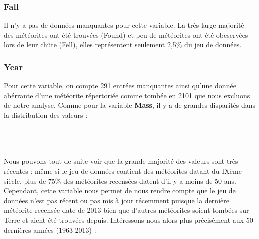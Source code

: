 \documentclass[12pt]{article}
\begin{document}
\subsubsection*{Fall}
Il n'y a pas de données manquantes pour cette variable. La très large majorité des météorites ont été trouvées (Found) et peu de météorites ont été obeservées lors de leur chûte (Fell), elles représentent seulement 2,5\% du jeu de données.
\subsubsection*{Year}
Pour cette variable, on compte 291 entrées manquantes ainsi qu'une donnée abérrante d'une météorite répertoriée comme tombée en 2101 que nous excluons de notre analyse. Comme pour la variable \textbf{Mass}, il y a de grandes disparités dans la distribution des valeurs :\\
\\
\\
\\
Nous pouvons tout de suite voir que la grande majorité des valeurs sont très récentes : même si le jeu de données contient des météorites datant du IXème siècle, plus de 75\% des météorites recensées datent d'il y a moins de 50 ans. Cependant, cette variable nous permet de nous rendre compte que le jeu de données n'est pas récent ou pas mis à jour récemment puisque la dernière météorite recensée date de 2013 bien que d'autres météorites soient tombées sur Terre et aient été trouvées depuis. Intéressons-nous alors plus précisément aux 50 dernières années (1963-2013) :\\
\end{document}
